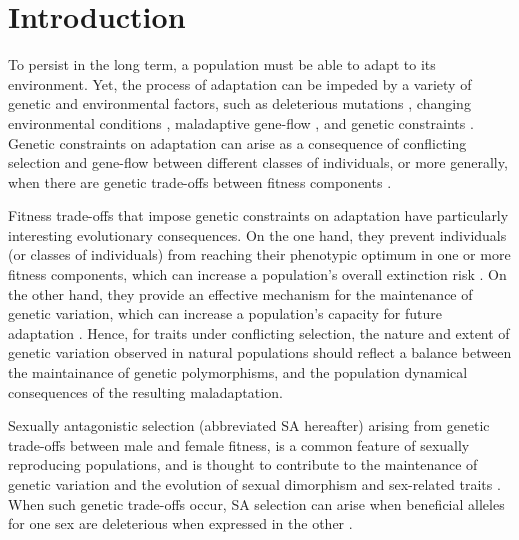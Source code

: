 \documentclass[11pt,draft]{article}
\begin{document}
\newpage{}

\section*{Introduction}


To persist in the long term, a population must be able to adapt to its environment. Yet, the process of adaptation can be impeded by a variety of genetic and environmental factors, such as deleterious mutations \citep{Haldane1937}, changing environmental conditions \citep{Maynard-Smith1976, LandeShannon1996,OrrUnckless2008}, maladaptive gene-flow \citep{KirkpatrickBarton1997, BolnickNosil2007}, and genetic constraints \citep{ConnallonHall2018, MatthewsConnallon2019}. Genetic constraints on adaptation can arise as a consequence of conflicting selection and gene-flow between different classes of individuals, or more generally, when there are genetic trade-offs between fitness components \citep{CharlesworthHughes2000, ConnallonHall2018}. 

Fitness trade-offs that impose genetic constraints on adaptation have particularly interesting evolutionary consequences. On the one hand, they prevent individuals (or classes of individuals) from reaching their phenotypic optimum in one or more fitness components, which can increase a population's overall extinction risk \citep{kokko2003sexy,harts2014demography}. On the other hand, they provide an effective mechanism for the maintenance of genetic variation, which can increase a population's capacity for future adaptation \citep{Fisher1930, CharlesworthHughes2000, ConnallonHall2018, MatthewsConnallon2019}. Hence, for traits under conflicting selection, the nature and extent of genetic variation observed in natural populations should reflect a balance between the maintainance of genetic polymorphisms, and the population dynamical consequences of the resulting maladaptation.

Sexually antagonistic selection (abbreviated SA hereafter) arising from genetic trade-offs between male and female fitness, is a common feature of sexually reproducing populations, and is thought to contribute to the maintenance of genetic variation and the evolution of sexual dimorphism and sex-related traits \citep{Lande1980, Rice1992, Charlesworth1999, RiceChippindale2001, BondurianskyChenoweth2009,Olito2019}. When such genetic trade-offs occur, SA selection can arise when beneficial alleles for one sex are deleterious when expressed in the other \citep{Kidwell1977, Rice1992, ConnallonClark2012}. 
\end{document}
